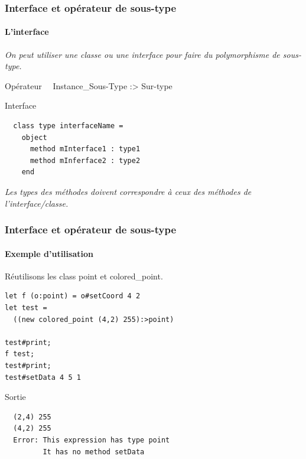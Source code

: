 \begin{frame}[fragile]
	\frametitle{Interface et opérateur de sous-type}
	\framesubtitle{L'interface}
	\textit{On peut utiliser une classe ou une interface pour faire du polymorphisme de sous-type.}
	\begin{block}{Opérateur}
		~~Instance\_Sous-Type \large{:>} Sur-type
	\end{block}
	\begin{block}{Interface}
		\begin{lstlisting}
  class type interfaceName =
    object
      method mInterface1 : type1
      method mInferface2 : type2
    end
		\end{lstlisting}
	\end{block}
	\textit{Les types des méthodes doivent correspondre à ceux des méthodes de l'interface/classe.}
\end{frame}

\begin{frame}[fragile]
	\frametitle{Interface et opérateur de sous-type}
	\framesubtitle{Exemple d'utilisation}
	Réutilisons les class point et colored\_point.
	\begin{lstlisting}
let f (o:point) = o#setCoord 4 2
let test = 
  ((new colored_point (4,2) 255):>point)

test#print;
f test;
test#print;
test#setData 4 5 1
	\end{lstlisting}
	\begin{block}{Sortie}
		\begin{lstlisting}
  (2,4) 255
  (4,2) 255
  Error: This expression has type point
         It has no method setData
		\end{lstlisting}
	\end{block}
\end{frame}
